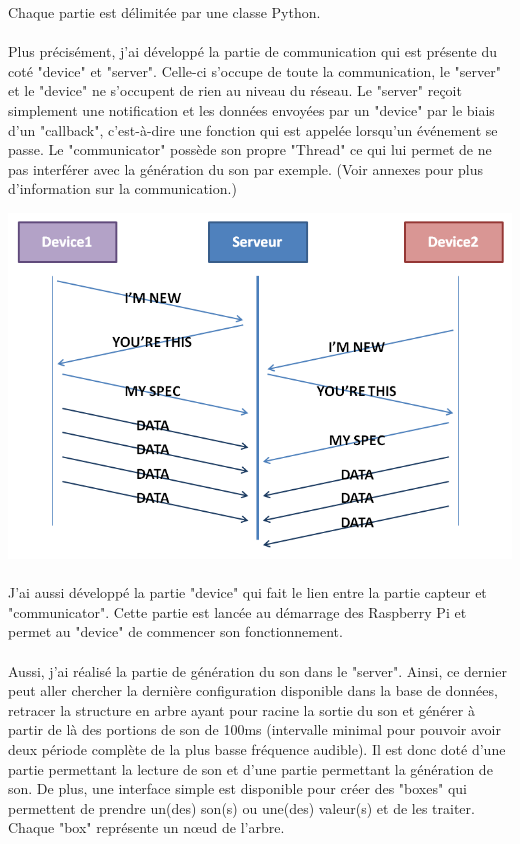 \documentclass[12pt]{article}
\begin{document}
	Chaque partie est délimitée par une classe Python.
	
	\paragraph{}
	Plus précisément, j'ai développé la partie de communication qui est présente du coté "device" et "server". Celle-ci s'occupe de toute la communication, le "server" et le "device" ne s'occupent de rien au niveau du réseau. Le "server" reçoit simplement une notification et les données envoyées par un "device" par le biais d'un "callback", c'est-à-dire une fonction qui est appelée lorsqu'un événement se passe. Le "communicator" possède son propre "Thread" ce qui lui permet de ne pas interférer avec la génération du son par exemple. (Voir annexes pour plus d'information sur la communication.)
	
	\vspace{1cm}
	\noindent
	\includegraphics[width=\textwidth]{communication_example}
	\vspace{1cm}
	
	\paragraph{}
	J'ai aussi développé la partie "device" qui fait le lien entre la partie capteur et "communicator". Cette partie est lancée au démarrage des Raspberry Pi et permet au "device" de commencer son fonctionnement.
	
	\paragraph{}
	Aussi, j'ai réalisé la partie de génération du son dans le "server". Ainsi, ce dernier peut aller chercher la dernière configuration disponible dans la base de données, retracer la structure en arbre ayant pour racine la sortie du son et générer à partir de là des portions de son de 100ms (intervalle minimal pour pouvoir avoir deux période complète de la plus basse fréquence audible). Il est donc doté d'une partie permettant la lecture de son et d'une partie permettant la génération de son. De plus, une interface simple est disponible pour créer des "boxes" qui permettent de prendre un(des) son(s) ou une(des) valeur(s) et de les traiter. Chaque "box" représente un nœud de l'arbre.
	
\end{document}
